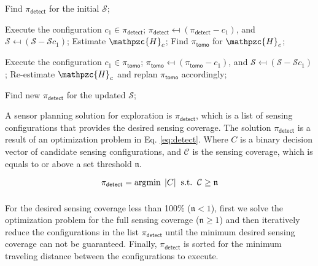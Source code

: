 \begin{algorithm}
	\caption{}
	\label{alg:1se}
	\begin{algorithmic}[1]
		\STATE Find $\pi_{\mathsf{detect}}$ for the initial $\mathcal{S}$; 
		
		\STATE Execute the configuration $c_1 \in \pi_{\mathsf{detect}}$;
		\STATE $\pi_{\mathsf{detect}} \mapsfrom (\pi_{\mathsf{detect}} - c_1) $, and $\mathcal{S} \mapsfrom (\mathcal{S} - \mathcal{S}{c_1} ) $;
		\STATE Estimate $\mathpzc{H}_c$;
		\STATE Find $\pi_{\mathsf{tomo}}$ for $\mathpzc{H}_c$;
		
		\STATE Execute the configuration $c_1 \in \pi_{\mathsf{tomo}}$;
		\STATE $\pi_{\mathsf{tomo}} \mapsfrom (\pi_{\mathsf{tomo}} - c_1) $, and $\mathcal{S} \mapsfrom (\mathcal{S} - \mathcal{S}{c_1} ) $;
		\STATE Re-estimate $\mathpzc{H}_c$ and replan $\pi_{\mathsf{tomo}}$ accordingly;
		\ENDWHILE
		
		\STATE Find new $\pi_{\mathsf{detect}}$ for the updated $\mathcal{S}$;%
		\ENDIF		
		\ENDWHILE		
	\end{algorithmic}
	\vskip 2pt
\end{algorithm}




A sensor planning solution for exploration is $\pi_{\mathsf{detect}}$, which is a list of sensing configurations that provides the desired sensing coverage. The solution $\pi_{\mathsf{detect}}$ is a result of an optimization problem in Eq. \ref{eq:detect}. Where $C$ is a binary decision vector of candidate sensing configurations, and $\mathcal{C}$ is the sensing coverage, which is equals to or above a set threshold $\mathfrak{n}$.

\begin{equation}
\pi_\mathsf{detect} = \displaystyle\operatorname*{\arg\!\min}_{} \; |C| \;\; \mbox{s.t.} \;\; \mathcal{C} \ge \mathfrak{n}
\label{eq:detect}
\end{equation}

For the desired sensing coverage less than 100\% ($\mathfrak{n} < 1$), first we solve the optimization problem for the full sensing coverage ($\mathfrak{n} \geq 1$) and then iteratively reduce the configurations in the list $\pi_\mathsf{detect}$ until the minimum desired sensing coverage can not be guaranteed. Finally, $\pi_\mathsf{detect}$ is sorted for the minimum traveling distance between the configurations to execute. %

